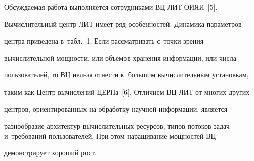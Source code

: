   Обсуждаемая работа выполняется сотрудниками ВЦ ЛИТ ОИЯИ~[5].


Вычислительный центр ЛИТ имеет ряд особенностей. Динамика параметров


центра приведена в~табл.~1. Если рассматривать с~точки зрения


вычислительной мощ\-ности, или объемов хранения информации, или числа


пользователей, то ВЦ нельзя отнести к~большим вычислительным установкам,


таким как Центр вычислений ЦЕРНа~[6]. Отличием ВЦ ЛИТ от многих других


центров, ориентированных на обработку научной информации, является


разнообразие архитектур вычислительных ресурсов, типов потоков задач и~требований пользователей. При этом наращивание мощностей ВЦ


демонстрирует хороший рост.





